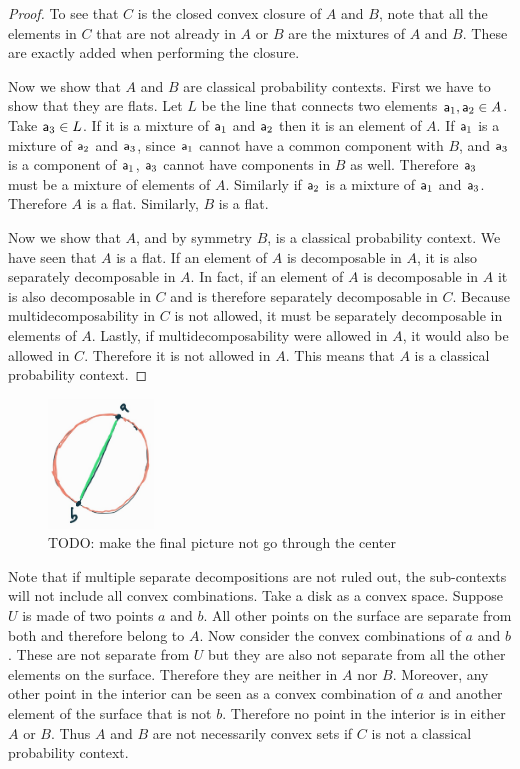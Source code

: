 \begin{proof}
	To see that $C$ is the closed convex closure of $A$ and $B$, note that all the elements in $C$ that are not already in $A$ or $B$ are the mixtures of $A$ and $B$. These are exactly added when performing the closure.
	
	Now we show that $A$ and $B$ are classical probability contexts. First we have to show that they are flats. Let $L$ be the line that connects two elements $\ens[a]_1, \ens[a]_2 \in A$. Take $\ens[a]_3 \in L$. If it is a mixture of $\ens[a]_1$ and $\ens[a]_2$ then it is an element of $A$. If $\ens[a]_1$ is a mixture of $\ens[a]_2$ and $\ens[a]_3$, since $\ens[a]_1$ cannot have a common component with $B$, and $\ens[a]_3$ is a component of $\ens[a]_1$, $\ens[a]_3$ cannot have components in $B$ as well. Therefore $\ens[a]_3$ must be a mixture of elements of $A$. Similarly if $\ens[a]_2$ is a mixture of $\ens[a]_1$ and $\ens[a]_3$. Therefore $A$ is a flat. Similarly, $B$ is a flat.
	
	Now we show that $A$, and by symmetry $B$, is a classical probability context. We have seen that $A$ is a flat. If an element of $A$ is decomposable in $A$, it is also separately decomposable in $A$. In fact, if an element of $A$ is decomposable in $A$ it is also decomposable in $C$ and is therefore separately decomposable in $C$. Because multidecomposability in $C$ is not allowed, it must be separately decomposable in elements of $A$. Lastly, if multidecomposability were allowed in $A$, it would also be allowed in $C$. Therefore it is not allowed in $A$. This means that $A$ is a classical probability context.
\end{proof}

\begin{figure}[h]
	\centering
	\includegraphics[width=0.25\textwidth]{tempimages/CounterexampleProbabilityContexts.jpg}
	\caption{TODO: make the final picture not go through the center}
\end{figure}

\begin{remark}
	Note that if multiple separate decompositions are not ruled out, the sub-contexts will not include all convex combinations. Take a disk as a convex space. Suppose $U$ is made of two points $a$ and $b$. All other points on the surface are separate from both and therefore belong to $A$. Now consider the convex combinations of $a$ and $b$. These are not separate from $U$ but they are also not separate from all the other elements on the surface. Therefore they are neither in $A$ nor $B$. Moreover, any other point in the interior can be seen as a convex combination of $a$ and another element of the surface that is not $b$. Therefore no point in the interior is in either $A$ or $B$. Thus $A$ and $B$ are not necessarily convex sets if $C$ is not a classical probability context.
\end{remark}

